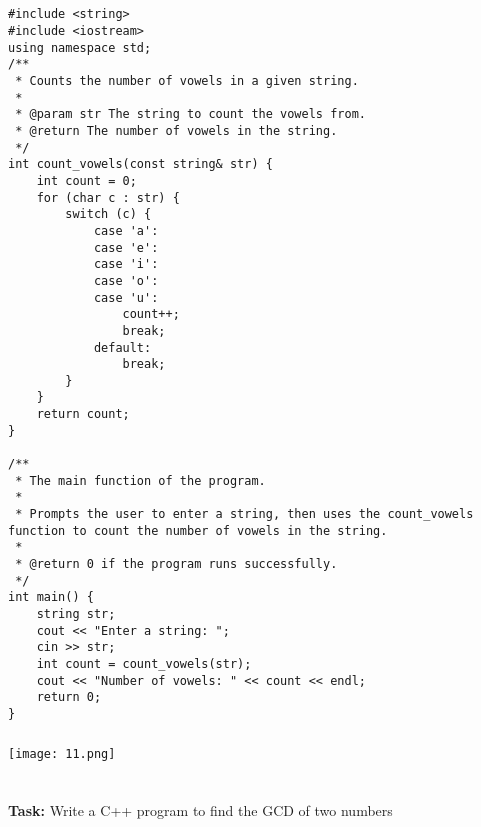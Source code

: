 \documentclass[12pt,a4paper]{article}
\begin{document}
\subsection{}
\begin{lstlisting}
#include <string>
#include <iostream>
using namespace std;
/**
 * Counts the number of vowels in a given string.
 *
 * @param str The string to count the vowels from.
 * @return The number of vowels in the string.
 */
int count_vowels(const string& str) {
    int count = 0;
    for (char c : str) {
        switch (c) {
            case 'a':
            case 'e':
            case 'i':
            case 'o':
            case 'u':
                count++;
                break;
            default:
                break;
        }
    }
    return count;
}

/**
 * The main function of the program.
 *
 * Prompts the user to enter a string, then uses the count_vowels function to count the number of vowels in the string.
 *
 * @return 0 if the program runs successfully.
 */
int main() {
    string str;
    cout << "Enter a string: ";
    cin >> str;
    int count = count_vowels(str);
    cout << "Number of vowels: " << count << endl;
    return 0;
}

\end{lstlisting}

\subsubsection{}
\begin{center}
    \texttt{[image: 11.png]}
\end{center}


\section{}
\textbf{Task:} Write a C++ program to find the GCD of two numbers
\end{document}
